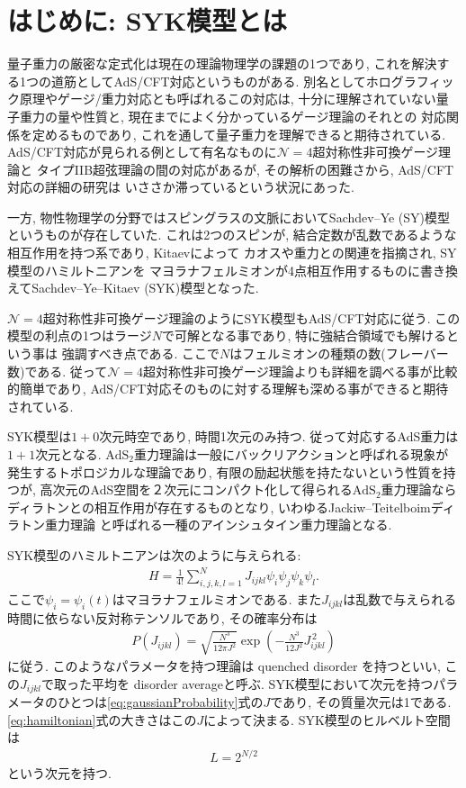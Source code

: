 \section{はじめに: SYK模型とは}
量子重力の厳密な定式化は現在の理論物理学の課題の1つであり, 
これを解決する1つの道筋としてAdS/CFT対応というものがある. 
別名としてホログラフィック原理やゲージ/重力対応とも呼ばれるこの対応は, 
十分に理解されていない量子重力の量や性質と, 現在までによく分かっているゲージ理論のそれとの
対応関係を定めるものであり, これを通して量子重力を理解できると期待されている. 
AdS/CFT対応が見られる例として有名なものに$\mathcal{N}=4$超対称性非可換ゲージ理論と
タイプIIB超弦理論の間の対応があるが, その解析の困難さから, AdS/CFT対応の詳細の研究は
いささか滞っているという状況にあった. 

一方, 物性物理学の分野ではスピングラスの文脈においてSachdev--Ye (SY)模型というものが存在していた. 
これは2つのスピンが, 結合定数が乱数であるような相互作用を持つ系であり, Kitaevによって
カオスや重力との関連を指摘され, SY模型のハミルトニアンを
マヨラナフェルミオンが4点相互作用するものに書き換えてSachdev--Ye--Kitaev (SYK)模型となった. 

$\mathcal{N}=4$超対称性非可換ゲージ理論のようにSYK模型もAdS/CFT対応に従う. 
この模型の利点の1つはラージ$N$で可解となる事であり, 特に強結合領域でも解けるという事は
強調すべき点である. ここで$N$はフェルミオンの種類の数(フレーバー数)である. 
従って$\mathcal{N}=4$超対称性非可換ゲージ理論よりも詳細を調べる事が比較的簡単であり, 
AdS/CFT対応そのものに対する理解も深める事ができると期待されている. 

SYK模型は$1+0$次元時空であり, 時間1次元のみ持つ. 
従って対応するAdS重力は$1 + 1$次元となる. 
$\mathrm{AdS_2}$重力理論は一般にバックリアクションと呼ばれる現象が発生するトポロジカルな理論であり, 
有限の励起状態を持たないという性質を持つが, 
高次元のAdS空間を２次元にコンパクト化して得られる$\mathrm{AdS_2}$重力理論なら
ディラトンとの相互作用が存在するものとなり, いわゆるJackiw--Teitelboimディラトン重力理論
と呼ばれる一種のアインシュタイン重力理論となる. 

SYK模型のハミルトニアンは次のように与えられる:
\begin{align}
  H = \frac{1}{4!}\sum_{i,j,k,l = 1}^{N} J_{ijkl}\psi_i\psi_j\psi_k\psi_l.
  \label{eq:hamiltonian}
\end{align}
ここで$\psi_i = \psi_i(t)$はマヨラナフェルミオンである. 
また$J_{ijkl}$は乱数で与えられる時間に依らない反対称テンソルであり, その確率分布は
\begin{align}
  P(J_{ijkl}) = \sqrt{\frac{N^3}{12\pi J^2}}
                \exp\left(-\frac{N^3}{12J^2}J_{ijkl}^{\, 2}\right)
	\label{eq:gaussianProbability}
\end{align}
に従う. 
このようなパラメータを持つ理論は quenched disorder を持つといい, 
この$J_{ijkl}$で取った平均を disorder averageと呼ぶ. 
SYK模型において次元を持つパラメータのひとつは\eqref{eq:gaussianProbability}式の$J$であり, 
その質量次元は1である. \eqref{eq:hamiltonian}式の大きさはこの$J$によって決まる. 
SYK模型のヒルベルト空間は
\begin{align}
	L = 2^{N/2}
\end{align}
という次元を持つ. 

